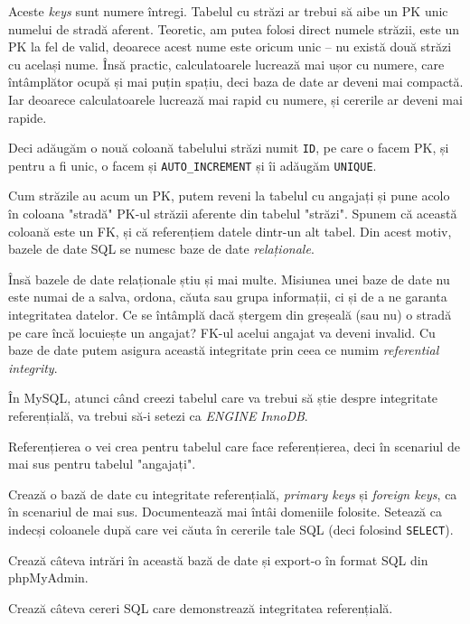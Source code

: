 Aceste \textit{keys} sunt numere întregi. Tabelul cu străzi ar trebui să aibe
un PK unic numelui de stradă aferent. Teoretic, am putea folosi direct
numele străzii, este un PK la fel de valid, deoarece acest nume este oricum unic --
nu există două străzi cu același nume. Însă practic, calculatoarele lucrează
mai ușor cu numere, care întâmplător ocupă și mai puțin spațiu, deci baza de date
ar deveni mai compactă. Iar deoarece calculatoarele lucrează mai rapid cu numere,
și cererile ar deveni mai rapide.

Deci adăugăm o nouă coloană tabelului străzi numit \texttt{ID}, pe care o facem
PK, și pentru a fi unic, o facem și \texttt{AUTO\_INCREMENT} și îi adăugăm
\texttt{UNIQUE}.

Cum străzile au acum un PK, putem reveni la tabelul cu angajați și pune acolo
în coloana "stradă" PK-ul străzii aferente din tabelul "străzi". Spunem că
această coloană este un FK, și că referențiem datele dintr-un alt tabel.
Din acest motiv, bazele de date SQL se numesc baze de date \textsl{relaționale}.

Însă bazele de date relaționale știu și mai multe. Misiunea unei baze de date
nu este numai de a salva, ordona, căuta sau grupa informații, ci și de a ne
garanta integritatea datelor. Ce se întâmplă dacă ștergem din greșeală (sau nu)
o stradă pe care încă locuiește un angajat? FK-ul acelui angajat va deveni
invalid. Cu baze de date putem asigura această integritate prin ceea ce numim
\textsl{referential integrity}.

În MySQL, atunci când creezi tabelul care va trebui să știe despre integritate
referențială, va trebui să-i setezi ca \textsl{ENGINE} \textsl{InnoDB}.

Referențierea o vei crea pentru tabelul care face referențierea, deci în scenariul
de mai sus pentru tabelul "angajați".

\begin{Exercise}[title={Referential Integrity}]
Crează o bază de date cu integritate referențială, \textit{primary keys} și
\textit{foreign keys}, ca în scenariul de mai sus. Documentează mai întâi domeniile
folosite. Setează ca indecși coloanele după care vei căuta în cererile tale
SQL (deci folosind \texttt{SELECT}).

Crează câteva intrări în această bază de date și export-o în format SQL din phpMyAdmin.

Crează câteva cereri SQL care demonstrează integritatea referențială.
\end{Exercise}

